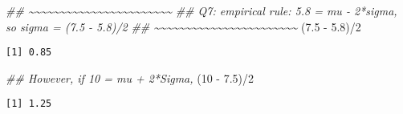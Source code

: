\documentclass[
  letterpaper,
  DIV=11,
  numbers=noendperiod]{scrreprt}
\newenvironment{Shaded}{\begin{snugshade}}{\end{snugshade}}
\newcommand{\DecValTok}[1]{\textcolor[rgb]{0.68,0.00,0.00}{#1}}
\newcommand{\DocumentationTok}[1]{\textcolor[rgb]{0.37,0.37,0.37}{\textit{#1}}}
\newcommand{\FloatTok}[1]{\textcolor[rgb]{0.68,0.00,0.00}{#1}}
\newcommand{\NormalTok}[1]{\textcolor[rgb]{0.00,0.23,0.31}{#1}}
\newcommand{\SpecialCharTok}[1]{\textcolor[rgb]{0.37,0.37,0.37}{#1}}
\begin{document}
\begin{Shaded}
\begin{Highlighting}[]
\DocumentationTok{\#\# \textasciitilde{}\textasciitilde{}\textasciitilde{}\textasciitilde{}\textasciitilde{}\textasciitilde{}\textasciitilde{}\textasciitilde{}\textasciitilde{}\textasciitilde{}\textasciitilde{}\textasciitilde{}\textasciitilde{}\textasciitilde{}\textasciitilde{}\textasciitilde{}\textasciitilde{}\textasciitilde{}\textasciitilde{}\textasciitilde{}\textasciitilde{}\textasciitilde{}\textasciitilde{}}
\DocumentationTok{\#\# Q7: empirical rule: 5.8 = mu {-} 2*sigma, so sigma = (7.5 {-} 5.8)/2}
\DocumentationTok{\#\# \textasciitilde{}\textasciitilde{}\textasciitilde{}\textasciitilde{}\textasciitilde{}\textasciitilde{}\textasciitilde{}\textasciitilde{}\textasciitilde{}\textasciitilde{}\textasciitilde{}\textasciitilde{}\textasciitilde{}\textasciitilde{}\textasciitilde{}\textasciitilde{}\textasciitilde{}\textasciitilde{}\textasciitilde{}\textasciitilde{}\textasciitilde{}\textasciitilde{}\textasciitilde{}}
\NormalTok{(}\FloatTok{7.5} \SpecialCharTok{{-}} \FloatTok{5.8}\NormalTok{)}\SpecialCharTok{/}\DecValTok{2}
\end{Highlighting}
\end{Shaded}

\begin{verbatim}
[1] 0.85
\end{verbatim}

\begin{Shaded}
\begin{Highlighting}[]
\DocumentationTok{\#\# However, if 10 = mu + 2*Sigma,}
\NormalTok{(}\DecValTok{10} \SpecialCharTok{{-}} \FloatTok{7.5}\NormalTok{)}\SpecialCharTok{/}\DecValTok{2}
\end{Highlighting}
\end{Shaded}

\begin{verbatim}
[1] 1.25
\end{verbatim}
\end{document}

